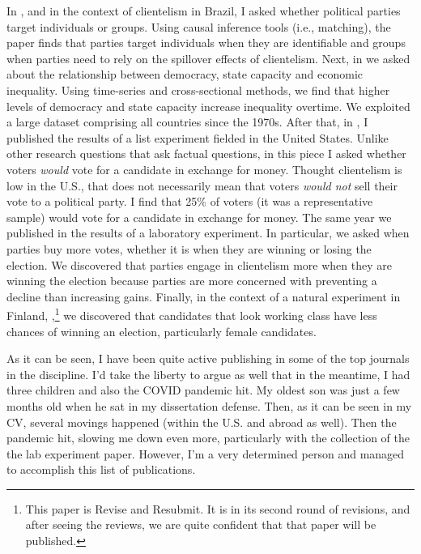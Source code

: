 \documentclass[10pt,stdletter,dateno,sigleft]{newlfm} %
\begin{document}
\begin{newlfm}
In \href{https://doi.org/10.1177/1866802X1801000202}{\textcite{Bahamonde2018}}, and in the context of clientelism in Brazil, I asked whether political parties target individuals or groups. Using causal inference tools (i.e., matching), the paper finds that parties target individuals when they are identifiable and groups when parties need to rely on the spillover effects of clientelism. Next, in \href{https://doi.org/10.1016/j.ejpoleco.2021.102048}{\textcite{Bahamonde2021a}} we asked about the relationship between democracy, state capacity and economic inequality. Using time-series and cross-sectional methods, we find that higher levels of democracy and state capacity increase inequality overtime. We exploited a large dataset comprising all countries since the 1970s. After that, in \href{https://link.springer.com/article/10.1057/s41269-020-00174-4}{\textcite{Bahamonde2020a}}, I published the results of a list experiment fielded in the United States. Unlike other research questions that ask factual questions, in this piece I asked whether voters \emph{would} vote for a candidate in exchange for money. Thought clientelism is low in the U.S., that does not necessarily mean that voters \emph{would not} sell their vote to a political party. I find that 25\% of voters (it was a representative sample) would vote for a candidate in exchange for money. The same year we published in \href{https://doi.org/10.1016/j.electstud.2022.102497}{\textcite{Bahamonde2022b}} the results of a laboratory experiment. In particular, we asked when parties buy more votes, whether it is when they are winning or losing the election. We discovered that parties engage in clientelism more when they are winning the election because parties are more concerned with preventing a decline than increasing gains. Finally, in the context of a natural experiment in Finland, \textcite{Bahamonde:2023},\footnote{This paper is Revise and Resubmit. It is in its second round of revisions, and after seeing the reviews, we are quite confident that that paper will be published.} we discovered that candidates that look working class have less chances of winning an election, particularly female candidates.

As it can be seen, I have been quite active publishing in some of the top journals in the discipline. I'd take the liberty to argue as well that in the meantime, I had three children and also the COVID pandemic hit. My oldest son was just a few months old when he sat in my dissertation defense. Then, as it can be seen in my CV, several movings happened (within the U.S. and abroad as well). Then the pandemic hit, slowing me down even more, particularly with the collection of the the lab experiment paper. However, I'm a very determined person and managed to accomplish this list of publications. 



{\unskip}

\newpage
\printbibliography



\end{newlfm}
\end{document}
